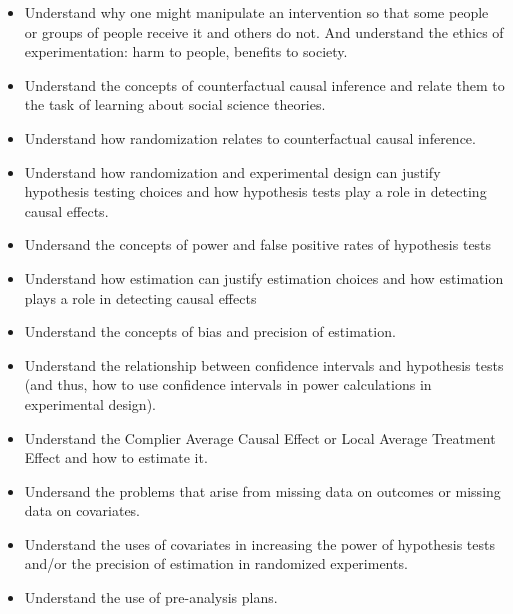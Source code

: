 \documentclass[letterpaper]{inzane_syllabus} %
\begin{document}
\begin{itemize}
    \item Understand why one might manipulate an intervention so that some people or groups of people receive it and others do not. And understand the ethics of experimentation: harm to people, benefits to society.
    \item Understand the concepts of counterfactual causal inference and relate them to the task of learning about social science theories.
    \item Understand how randomization relates to counterfactual causal inference.
    \item Understand how randomization and experimental design can justify hypothesis testing choices and how hypothesis tests play a role in detecting causal effects.
    \item Undersand the concepts of power and false positive rates of hypothesis tests
    \item Understand how estimation can justify estimation choices and how estimation plays a role in detecting causal effects
    \item Understand the concepts of bias and precision of estimation.
    \item Understand the relationship between confidence intervals and hypothesis tests (and thus, how to use confidence intervals in power calculations in experimental design).
    \item Understand the Complier Average Causal Effect or Local Average Treatment Effect and how to estimate it.
    \item Undersand the problems that arise from missing data on outcomes or missing data on covariates.
    \item Understand the uses of covariates in increasing the power of hypothesis tests and/or the precision of estimation in randomized experiments.
    \item Understand the use of pre-analysis plans.
\end{itemize}





\end{document}
